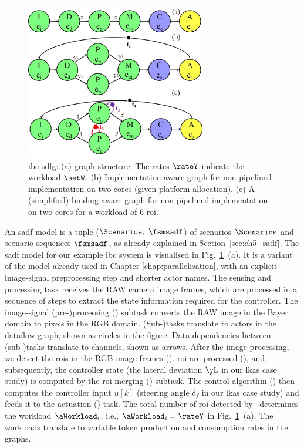 \begin{figure}
    \centering
    \includegraphics[width=0.7\textwidth]{images/modelGraphs.jpg}
    \vspace{-1em}
    \caption{\Gls{ibc} \gls{sdfg}: (a) graph structure. The rates $\rateY$ indicate the workload $\setW$. (b) Implementation-aware graph for non-pipelined implementation on two cores (given platform allocation). (c) A (simplified) binding-aware graph for non-pipelined implementation on two cores for a workload of 6 \gls{roi}. 
}
    \label{fig:ch7_SADF}
\end{figure}
An \gls{sadf} model is a tuple ($\Scenarios,\ \fsmsadf$) of scenarios $\Scenarios$ and scenario sequences $\fsmsadf$, as already explained in Section~\ref{sec:ch5_sadf}.
The \gls{sadf} model for our example \gls{ibc} system is visualised in Fig.~\ref{fig:ch7_SADF}~(a). It is a variant of the model already used in Chapter \ref{chap:parallelisation}, with an explicit image-signal preprocessing step and shorter actor names.
The sensing and processing task receives the RAW camera image frames, which are processed in a sequence of steps to extract the state information required for the controller. 
The image-signal (pre-)processing (\taskISP) subtask converts the RAW image in the Bayer domain to pixels in the RGB domain. \mbox{(Sub-)}tasks translate to actors in the dataflow graph, shown as circles in the figure. Data dependencies between \mbox{(sub-)}tasks translate to channels, shown as arrows.
After the image processing, we detect the \glspl{roi} in the RGB image frames (\taskRoID). \Gls{roi} are processed (\taskRoIP), and, subsequently, the controller state (the lateral deviation $\yL$ in our \gls{lkas} case study) is computed by the \gls{roi} merging (\taskRoIM) subtask. The control algorithm (\taskC) then computes the controller input $u[k]$ (steering angle $\delta_f$ in our \gls{lkas} case study) and feeds it to the actuation (\taskA) task.
The total number of \gls{roi} detected by \taskRoID\ determines the workload $\aWorkload_i$, i.e., $\aWorkload_i=\rateY$ in Fig.~\ref{fig:ch7_SADF}~(a).
The workloads translate to variable token production and consumption rates in the graphs.

